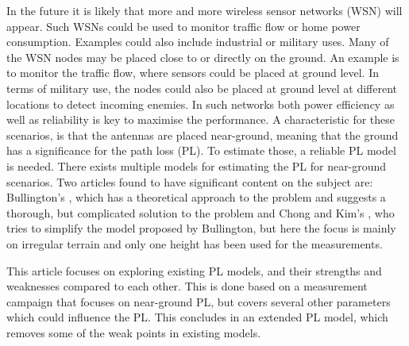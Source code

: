 
In the future it is likely that more and more wireless sensor networks (WSN) will appear. Such WSNs could be used to monitor traffic flow or home power consumption. Examples could also include industrial or military uses. Many of the WSN nodes may be placed close to or directly on the ground. An example is to monitor the traffic flow, where sensors could be placed at ground level. In terms of military use, the nodes could also be placed at ground level at different locations to detect incoming enemies. In such networks both power efficiency as well as reliability is key to maximise the performance. A characteristic for these scenarios, is that the antennas are placed near-ground, meaning that the ground has a significance for the path loss (PL). To estimate those, a reliable PL model is needed.
There exists multiple models for estimating the PL for near-ground scenarios. Two articles found to have significant content on the subject are: Bullington's \cite{Bullington}, which has a theoretical approach to the problem and suggests a thorough, but complicated solution to the problem and Chong and Kim's \cite{Chong}, who tries to simplify the model proposed by Bullington, but here the focus is mainly on irregular terrain and only one height has been used for the measurements.

This article focuses on exploring existing PL models, and their strengths and weaknesses compared to each other. This is done based on a measurement campaign that focuses on near-ground PL, but covers several other parameters which could influence the PL. This concludes in an extended PL model, which removes some of the weak points in existing models.



